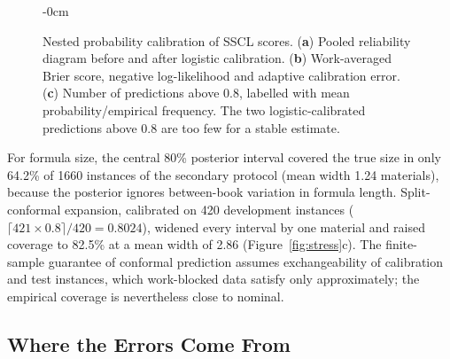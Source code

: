 \documentclass[applsci,article,submit,oneauthor]{Definitions/mdpi}
\begin{document}
\begin{figure}[H]
\begin{adjustwidth}{-\extralength}{0cm}
\end{adjustwidth}
\caption{Nested probability calibration of SSCL scores. (\textbf{a}) Pooled reliability diagram before and after logistic calibration. (\textbf{b}) Work-averaged Brier score, negative log-likelihood and adaptive calibration error. (\textbf{c}) Number of predictions above 0.8, labelled with mean probability/empirical frequency. The two logistic-calibrated predictions above 0.8 are too few for a stable estimate.}
\label{fig:calibration}
\end{figure}

For formula size, the central 80\% posterior interval covered the true size in only 64.2\% of 1660 instances of the secondary protocol (mean width 1.24 materials), because the posterior ignores between-book variation in formula length. Split-conformal expansion, calibrated on 420 development instances ($\lceil 421\times0.8\rceil/420=0.8024$), widened every interval by one material and raised coverage to 82.5\% at a mean width of 2.86 (Figure~\ref{fig:stress}c). The finite-sample guarantee of conformal prediction assumes exchangeability of calibration and test instances, which work-blocked data satisfy only approximately; the empirical coverage is nevertheless close to nominal.

\subsection{Where the Errors Come From}
\label{sec:errors}
\end{document}
